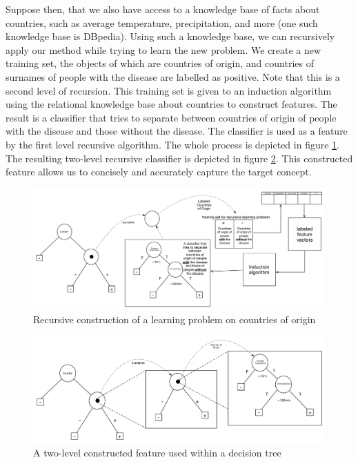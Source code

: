 \documentclass[twoside,11pt]{article}
\theoremstyle{definition}
\begin{document}
Suppose then, that we also have access to a knowledge base of facts about countries, such as average temperature, precipitation, and more (one such knowledge base is DBpedia). Using such a knowledge base, we can recursively apply our method while trying to learn the new problem. We create a new training set, the objects of which are countries of origin, and countries of surnames of people with the disease are labelled as positive. Note that this is a second level of recursion. This training set is given to an induction algorithm using the relational knowledge base about countries to construct features. The result is a classifier that tries to separate between countries of origin of people with the disease and those without the disease. The classifier is used as a feature by the first level recursive algorithm. The whole process is depicted in figure \ref{fig:moving_to_lvl2}. The resulting two-level recursive classifier is depicted in figure \ref{fig:lvl2_tree}. This constructed feature allows us to concisely and accurately capture the target concept.

\begin{figure}[t]
	\centering
	\includegraphics[width=\linewidth]{fig4.pdf}
	\caption{Recursive construction of a learning problem on countries of origin}
	\label{fig:moving_to_lvl2}
\end{figure}

\begin{figure}[t]
	\centering
	\includegraphics[width=\linewidth]{fig3.pdf}
	\caption{A two-level constructed feature used within a decision tree}
	\label{fig:lvl2_tree}
\end{figure}
\end{document}
